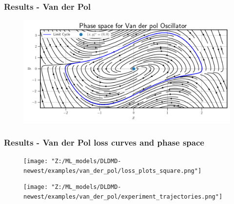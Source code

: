 \documentclass[11pt,aspectratio=169]{beamer}
\begin{document}

    \begin{frame}
        \frametitle{Results - Van der Pol}
        \begin{figure}
            \centering
            \includegraphics[width=\textwidth]{../Figures/van_der_pol_phase_space.png}
        \end{figure}
    \end{frame}

    \begin{frame}
        \frametitle{Results - Van der Pol loss curves and phase space}
        \begin{figure}
            \centering
            \begin{minipage}{.5\textwidth}
                \texttt{[image: "Z:/ML\_models/DLDMD-newest/examples/van\_der\_pol/loss\_plots\_square.png"]}
            \end{minipage}%
            \begin{minipage}{.5\textwidth}
                \texttt{[image: "Z:/ML\_models/DLDMD-newest/examples/van\_der\_pol/experiment\_trajectories.png"]}
            \end{minipage}
        \end{figure}
    \end{frame}
\end{document}
